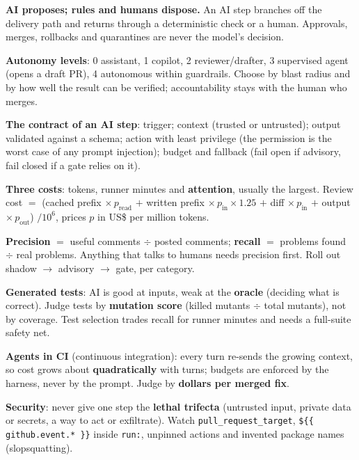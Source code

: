 \stages{\stEstimate\ \stDesign\ \stDeep}

\begin{know}
  \item \textbf{AI proposes; rules and humans dispose.} An AI step branches off the delivery path and returns through a deterministic check or a human. Approvals, merges, rollbacks and quarantines are never the model's decision.
  \item \textbf{Autonomy levels}: 0 assistant, 1 copilot, 2 reviewer/drafter, 3 supervised agent (opens a draft PR), 4 autonomous within guardrails. Choose by blast radius and by how well the result can be verified; accountability stays with the human who merges.
  \item \textbf{The contract of an AI step}: trigger; context (trusted or untrusted); output validated against a schema; action with least privilege (the permission is the worst case of any prompt injection); budget and fallback (fail open if advisory, fail closed if a gate relies on it).
  \item \textbf{Three costs}: tokens, runner minutes and \textbf{attention}, usually the largest. Review cost $=$ (cached prefix $\times\, p_\text{read}$ $+$ written prefix $\times\, p_\text{in} \times 1.25$ $+$ diff $\times\, p_\text{in}$ $+$ output $\times\, p_\text{out}$) $/10^6$, prices $p$ in US\$ per million tokens.
  \item \textbf{Precision} $=$ useful comments $\div$ posted comments; \textbf{recall} $=$ problems found $\div$ real problems. Anything that talks to humans needs precision first. Roll out shadow $\to$ advisory $\to$ gate, per category.
  \item \textbf{Generated tests}: AI is good at inputs, weak at the \textbf{oracle} (deciding what is correct). Judge tests by \textbf{mutation score} (killed mutants $\div$ total mutants), not by coverage. Test selection trades recall for runner minutes and needs a full-suite safety net.
  \item \textbf{Agents in CI} (continuous integration): every turn re-sends the growing context, so cost grows about \textbf{quadratically} with turns; budgets are enforced by the harness, never by the prompt. Judge by \textbf{dollars per merged fix}.
  \item \textbf{Security}: never give one step the \textbf{lethal trifecta} (untrusted input, private data or secrets, a way to act or exfiltrate). Watch \texttt{pull\_request\_target}, \texttt{\$\{\{ github.event.* \}\}} inside \texttt{run:}, unpinned actions and invented package names (slopsquatting).
\end{know}

